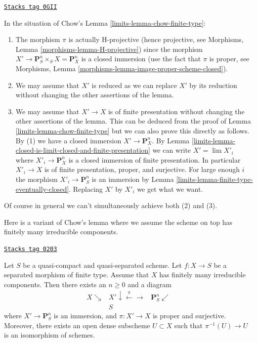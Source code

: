 \begin{remark}
\label{limits-remark-chow-finite-type}
\href{https://stacks.math.columbia.edu/tag/0GII}{\texttt{Stacks tag 0GII}}

In the situation of Chow's Lemma \ref{limits-lemma-chow-finite-type}:
\begin{enumerate}
\item The morphism $\pi$ is actually H-projective (hence projective, see
Morphisms, Lemma \ref{morphisms-lemma-H-projective})
since the morphism $X' \to \mathbf{P}^n_S \times_S X = \mathbf{P}^n_X$
is a closed immersion (use the fact that $\pi$ is proper, see
Morphisms, Lemma \ref{morphisms-lemma-image-proper-scheme-closed}).
\item We may assume that $X'$ is reduced as we can replace $X'$ by
its reduction without changing the other assertions of the lemma.
\item We may assume that $X' \to X$ is of finite presentation
without changing the other assertions of the lemma. This can be deduced
from the proof of Lemma \ref{limits-lemma-chow-finite-type} but we can also prove
this directly as follows. By (1) we have a closed immersion
$X' \to \mathbf{P}^n_X$. By
Lemma \ref{limits-lemma-closed-is-limit-closed-and-finite-presentation} we can write
$X' = \lim X'_i$ where $X'_i \to \mathbf{P}^n_X$ is a closed
immersion of finite presentation. In particular $X'_i \to X$ is
of finite presentation, proper, and surjective. For large enough
$i$ the morphism $X'_i \to \mathbf{P}^n_S$ is an immersion by
Lemma \ref{limits-lemma-finite-type-eventually-closed}. Replacing
$X'$ by $X'_i$ we get what we want.
\end{enumerate}
Of course in general we can't simultaneously achieve both (2) and (3).
\end{remark}

Here is a variant of Chow's lemma where we assume the scheme
on top has finitely many irreducible components.

\begin{lemma}
\label{limits-lemma-chow-EGA}
\href{https://stacks.math.columbia.edu/tag/0203}{\texttt{Stacks tag 0203}}

Let $S$ be a quasi-compact and quasi-separated scheme.
Let $f : X \to S$ be a separated morphism of finite type.
Assume that $X$ has finitely many irreducible components.
Then there exists an $n \geq 0$ and a diagram
$$
\begin{array}{ccc}X \searrow & X' \downarrow\overset{\pi}{\longleftarrow}\longrightarrow & \mathbf{P}^n_S \swarrow \\  & S & \end{array}
$$
where $X' \to \mathbf{P}^n_S$ is an immersion, and
$\pi : X' \to X$ is proper and surjective. Moreover, there exists
an open dense subscheme $U \subset X$ such that $\pi^{-1}(U) \to U$
is an isomorphism of schemes.
\end{lemma}

